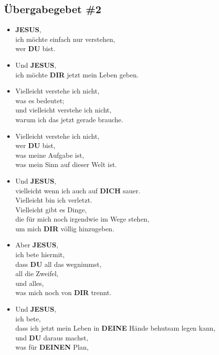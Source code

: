 \documentclass[10pt,a5paper]{article}
\newcommand{\Deinen}[0]{\textbf{DEINEN}}
\newcommand{\Deine}[0]{\textbf{DEINE}}
\newcommand{\Dich}[0]{\textbf{DICH}}
\newcommand{\Dir}[0]{\textbf{DIR}}
\newcommand{\Du}[0]{\textbf{DU}}
\newcommand{\Jesus}[0]{\textbf{JESUS}}
\begin{document}
	\subsection{\"Ubergabegebet \#2}
		\begin{itemize}[nosep]
			\item	{\Jesus},
					\\
					ich m\"ochte einfach nur verstehen,
					\\
					wer {\Du} bist.
			\item	Und {\Jesus},
					\\
					ich m\"ochte {\Dir} jetzt mein Leben geben.
			\item	Vielleicht verstehe ich nicht,
					\\
					was es bedeutet;
					\\
					und vielleicht verstehe ich nicht,
					\\
					warum ich das jetzt gerade brauche.
			\item	Vielleicht verstehe ich nicht,
					\\
					wer {\Du} bist,
					\\
					was meine Aufgabe ist,
					\\
					was mein Sinn auf dieser Welt ist.
			\item	Und {\Jesus},
					\\
					vielleicht wenn ich auch auf {\Dich} sauer.
					\\
					Vielleicht bin ich verletzt.
					\\
					Vielleicht gibt es Dinge,
					\\
					die für mich noch irgendwie im Wege stehen,
					\\
					um mich {\Dir} v\"ollig hinzugeben.
			\item	Aber {\Jesus},
					\\
					ich bete hiermit,
					\\
					dass {\Du} all das wegnimmst,
					\\
					all die Zweifel,
					\\
					und alles,
					\\
					was mich noch von {\Dir} trennt.
			\item	Und {\Jesus},
					\\
					ich bete,
					\\
					dass ich jetzt mein Leben in {\Deine} H\"ande behutsam legen kann,
					\\
					und {\Du} daraus machst,
					\\
					was f\"ur {\Deinen} Plan,

\end{itemize}
\end{document}
